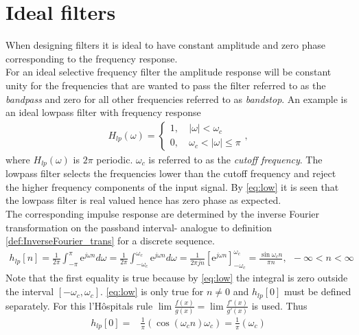 \section{Ideal filters} \label{sec:ideal_filt}
When designing filters it is ideal to have constant amplitude and zero phase corresponding to the frequency response. \\ For an ideal selective frequency filter the amplitude response will be constant unity for the frequencies that are wanted to pass the filter referred to as the \textit{bandpass} and zero for all other frequencies referred to as \textit{bandstop}. An example is an ideal lowpass filter with frequency response 
\begin{align}\label{eq:low}
H_{lp}(\omega)=
\left\{ \begin{matrix}
1, &\ \left| \omega \right|< \omega_c \\
0, &\ \omega_c < \left| \omega \right| \leq \pi
\end{matrix}\right.,
\end{align}     
where $H_{lp}(\omega)$ is $2\pi$ periodic. $\omega_c$ is referred to as the \textit{cutoff frequency}. The lowpass filter selects the frequencies lower than the cutoff frequency and reject the higher frequency components of the input signal. By \eqref{eq:low} it is seen that the lowpass filter is real valued hence has zero phase as expected. \\
The corresponding impulse response are determined by the inverse Fourier transformation on the passband interval- analogue to definition \ref{def:InverseFourier_trans} for a discrete sequence.
\begin{align}\label{eq:low_im}
h_{lp}[n]= \frac{1}{2\pi}\int_{-\pi}^{\pi}\text{e}^{j\omega n} d\omega =\frac{1}{2\pi}\int_{-\omega_c}^{\omega_c}\text{e}^{j\omega n} d\omega = \frac{1}{2\pi j n}\left[\text{e}^{j\omega n} \right]_{-\omega_c}^{\omega_c} = \frac{\sin \omega_c n}{\pi n }, \ \  -\infty < n < \infty
\end{align} 
Note that the first equality is true because by \eqref{eq:low} the integral is zero outside the interval $[-\omega_c, \omega_c]$. \eqref{eq:low} is only true for $n \neq 0$ and $h_{lp}[0]$ must be defined separately. For this l'Hôspitals rule $\lim \frac{f(x)}{g(x)}=\lim \frac{f'(x)}{g'(x)}$ is used. Thus
\begin{align}
h_{lp}[0]=& \frac{1}{\pi} \left( \cos\left( \omega_{c} n \right)\omega_{c}\right)
= \frac{1}{\pi}\left( \omega_{c} \right)
\end{align}

